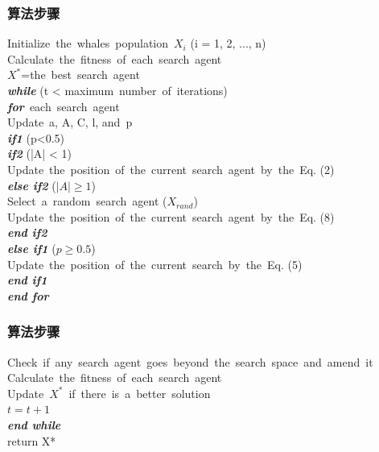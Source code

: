 \begin{frame}
  \frametitle{算法步骤}
 Initialize\ the\ whales\ population\ $X_{i}$ (i = 1, 2, ..., n)\\
 Calculate\ the\ fitness\ of\ each\ search\ agent\\
 $X^{*}$=the\ best\ search\ agent\\
 \textbf{\emph{while}} (t < maximum\ number\ of\ iterations)\\
 \qquad \textbf{\emph{for}}\ each\ search\ agent\\
 \qquad Update\ a, A, C, l, and\ p\\
 \qquad \qquad \textbf{\emph{if1}} (p<0.5)\\
 \qquad \qquad \qquad \textbf{\emph{if2}} (|A| < 1)\\
 \qquad \qquad \qquad \qquad Update\ the\ position\ of\ the\ current\ search\ agent\ by\ the\ Eq. (2)\\
 \qquad \qquad \qquad \textbf{\emph{else if2}} ($|A|\geq 1$)\\
 \qquad \qquad \qquad \qquad Select\ a\ random\ search\ agent ($X_{rand}$)\\
 \qquad \qquad \qquad \qquad Update\ the\ position\ of\ the\ current\ search\ agent\ by\ the\ Eq. (8)\\
 \qquad \qquad \qquad \textbf{\emph{end if2}}\\
 \qquad \qquad \textbf{\emph{else if1}} ($p\geq  0.5$)\\
 \qquad \qquad \qquad Update\ the\ position\ of\ the\ current\ search\ by\ the\ Eq. (5)\\
 \qquad \qquad \textbf{\emph{end if1}}\\
 \qquad \textbf{\emph{end for}}\\
\end{frame}

\begin{frame}
  \frametitle{算法步骤}

 \qquad Check\ if\ any\ search\ agent\ goes\ beyond\ the\ search\ space\ and\ amend\ it\\
 \qquad Calculate\ the\ fitness\ of\ each\ search\ agent\\
 \qquad Update\ $X^{*}$\ if\ there\ is\ a\ better\ solution\\
 \qquad $t=t+1$\\
 \textbf{\emph{end while}}\\
 return X*
\end{frame}


